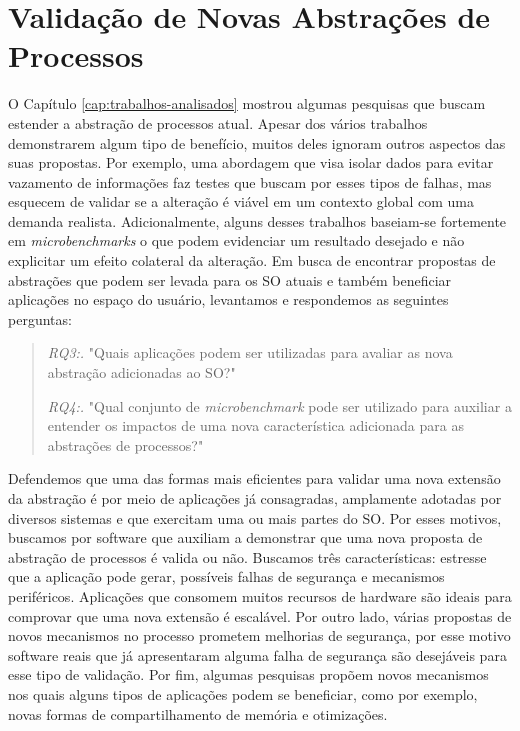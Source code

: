 \chapter{Validação de Novas Abstrações de Processos}
\label{cap:validacoes}

O Capítulo \ref{cap:trabalhos-analisados} mostrou algumas pesquisas que buscam
estender a abstração de processos atual. Apesar dos vários trabalhos
demonstrarem algum tipo de benefício, muitos deles ignoram outros aspectos das
suas propostas. Por exemplo, uma abordagem que visa isolar dados para evitar
vazamento de informações faz testes que buscam por esses tipos de falhas, mas
esquecem de validar se a alteração é viável em um contexto global com uma
demanda realista.  Adicionalmente, alguns desses trabalhos baseiam-se
fortemente em \textit{microbenchmarks} o que podem evidenciar um resultado
desejado e não explicitar um efeito colateral da alteração. Em busca de
encontrar propostas de abstrações que podem ser levada para os SO atuais e
também beneficiar aplicações no espaço do usuário, levantamos e respondemos as
seguintes perguntas:

\begin{quote}
 \item \textit{RQ3:.} "Quais aplicações podem ser utilizadas para avaliar as nova abstração adicionadas ao SO?"
 \item \textit{RQ4:.} "Qual conjunto de \emph{microbenchmark} pode ser utilizado para auxiliar a entender os impactos de uma nova característica adicionada para as abstrações de processos?"
\end{quote}

Defendemos que uma das formas mais eficientes para validar uma nova extensão da
abstração é por meio de aplicações já consagradas, amplamente adotadas por
diversos sistemas e que exercitam uma ou mais partes do SO. Por esses motivos,
buscamos por software que auxiliam a demonstrar que uma nova proposta de
abstração de processos é valida ou não. Buscamos três características: estresse
que a aplicação pode gerar, possíveis falhas de segurança e mecanismos
periféricos.  Aplicações que consomem muitos recursos de hardware são ideais
para comprovar que uma nova extensão é escalável. Por outro lado, várias
propostas de novos mecanismos no processo prometem melhorias de segurança, por
esse motivo software reais que já apresentaram alguma falha de segurança são
desejáveis para esse tipo de validação. Por fim, algumas pesquisas propõem
novos mecanismos nos quais alguns tipos de aplicações podem se beneficiar, como
por exemplo, novas formas de compartilhamento de memória e otimizações.

